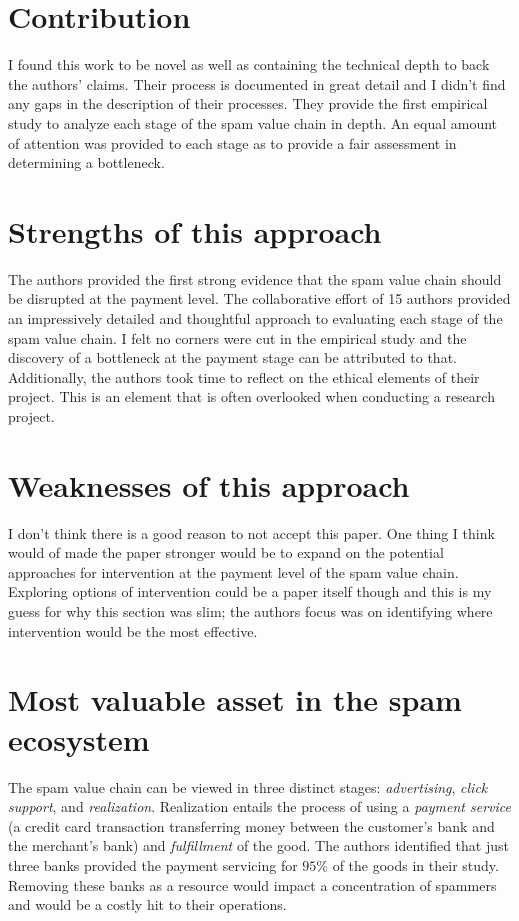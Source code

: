 \documentclass[fleqn,11pt]{wlpeerj} %
\begin{document}
\section*{Contribution}
I found this work to be novel as well as containing the technical depth to back the authors' claims. Their process is documented in great detail and I didn't find any gaps in the description of their processes. They provide the first empirical study to analyze each stage of the spam value chain in depth. An equal amount of attention was provided to each stage as to provide a fair assessment in determining a bottleneck.


\section*{Strengths of this approach}

The authors provided the first strong evidence that the spam value chain should be disrupted at the payment level. The collaborative effort of 15 authors provided an impressively detailed and thoughtful approach to evaluating each stage of the spam value chain. I felt no corners were cut in the empirical study and the discovery of a bottleneck at the payment stage can be attributed to that. Additionally, the authors took time to reflect on the ethical elements of their project. This is an element that is often overlooked when conducting a research project.

\section*{Weaknesses of this approach}

I don't think there is a good reason to not accept this paper. One thing I think would of made the paper stronger would be to expand on the potential approaches for intervention at the payment level of the spam value chain. Exploring options of intervention could be a paper itself though and this is my guess for why this section was slim; the authors focus was on identifying where intervention would be the most effective. 

\section*{Most valuable asset in the spam ecosystem}
The spam value chain can be viewed in three distinct stages: \textit{advertising}, \textit{click support}, and \textit{realization}. Realization entails the process of using a \textit{payment service} (a credit card transaction transferring money between the customer's bank and the merchant's bank) and \textit{fulfillment} of the good. The authors identified that just three banks provided the payment servicing for $95\%$ of the goods in their study. Removing these banks as a resource would impact a concentration of spammers and would be a costly hit to their operations. 
\end{document}
